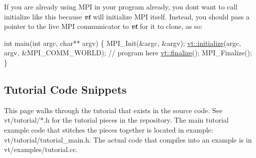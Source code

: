 If you are already using M\+PI in your program already, you don\textquotesingle{}t want to call initialize like this because {\bfseries {\itshape vt}} will initialize M\+PI itself. Instead, you should pass a pointer to the live M\+PI communicator to {\bfseries {\itshape vt}} for it to clone, as so\+:


\begin{DoxyCode}
\textcolor{keywordtype}{int} main(\textcolor{keywordtype}{int} argc, \textcolor{keywordtype}{char}** argv) \{
  MPI\_Init(&argc, &argv);
  \hyperlink{namespacevt_aaa266774ea8339c58be0202b00fafa62}{vt::initialize}(argc, argv, &MPI\_COMM\_WORLD);
   \textcolor{comment}{// program here}
  \hyperlink{namespacevt_a540d90dbd6e97b69f1dcbc9ee9314cff}{vt::finalize}();
  MPI\_Finalize();
\}
\end{DoxyCode}
\hypertarget{tutorial_tutorial-walkthrough}{}\subsection{Tutorial Code Snippets}\label{tutorial_tutorial-walkthrough}
This page walks through the tutorial that exists in the source code. See {\ttfamily vt/tutorial/$\ast$.h} for the tutorial pieces in the repository. The main tutorial example code that stitches the pieces together is located in example\+: {\ttfamily vt/tutorial/tutorial\+\_\+main.\+h}. The actual code that compiles into an example is in {\ttfamily vt/examples/tutorial.\+cc}.


